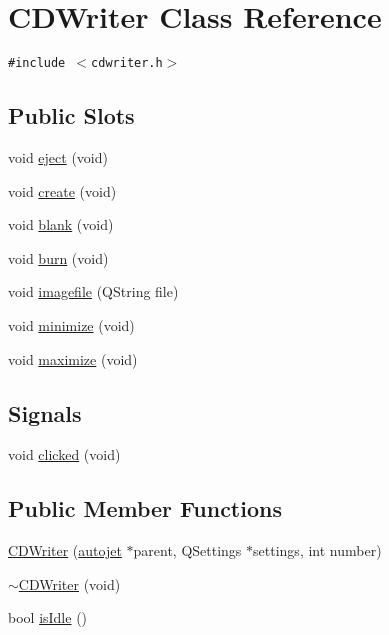 \hypertarget{classCDWriter}{
\section{CDWriter Class Reference}
\label{classCDWriter}
}
{\tt \#include $<$cdwriter.h$>$}

\subsection*{Public Slots}
\begin{CompactItemize}
\item 
void \hyperlink{classCDWriter_383389be2723db312550f11951efd1a3}{eject} (void)
\item 
void \hyperlink{classCDWriter_a5dd84acfc0eb5f4a8dc8cb88b305996}{create} (void)
\item 
void \hyperlink{classCDWriter_74d2e90422414e44485b258b5be222d8}{blank} (void)
\item 
void \hyperlink{classCDWriter_844d256e7cccd1de34db4e5fa3690dc6}{burn} (void)
\item 
void \hyperlink{classCDWriter_f7035db82b553bab5942c320a348728e}{imagefile} (QString file)
\item 
void \hyperlink{classCDWriter_a3db5f6361622dd83a529340df737c11}{minimize} (void)
\item 
void \hyperlink{classCDWriter_2ea8afb43e2cdcd07b0d783dcf5ac989}{maximize} (void)
\end{CompactItemize}
\subsection*{Signals}
\begin{CompactItemize}
\item 
void \hyperlink{classCDWriter_0191ce407c2ebb99f3140bb44b9a9170}{clicked} (void)
\end{CompactItemize}
\subsection*{Public Member Functions}
\begin{CompactItemize}
\item 
\hyperlink{classCDWriter_44fe78fc3cfdb9c9cc0a427686141ade}{CDWriter} (\hyperlink{classautojet}{autojet} $\ast$parent, QSettings $\ast$settings, int number)
\item 
\hyperlink{classCDWriter_072733059c989992f725774bee5331b7}{$\sim$CDWriter} (void)
\item 
bool \hyperlink{classCDWriter_ad6c510839af2c175cfabeaa3067431b}{isIdle} ()
\end{CompactItemize}
